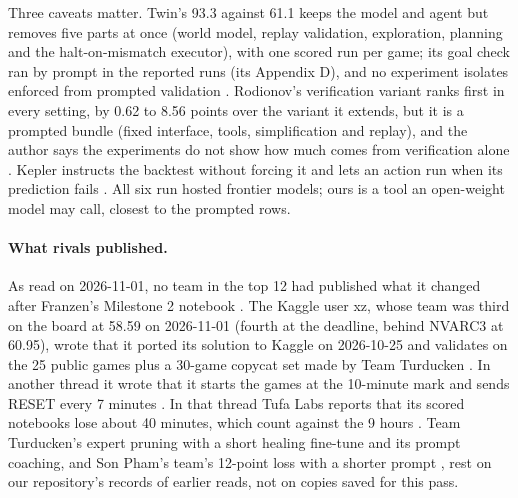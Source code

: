 Three caveats matter. %
Twin's 93.3 against 61.1 keeps the model and agent but removes five parts at once (world model, replay validation, exploration, planning and the halt-on-mismatch executor), with one scored run per game; its goal check ran by prompt in the reported runs (its Appendix D), and no experiment isolates enforced from prompted validation \citep{skoutnev2026twin}. %
Rodionov's verification variant ranks first in every setting, by 0.62 to 8.56 points over the variant it extends, but it is a prompted bundle (fixed interface, tools, simplification and replay), and the author says the experiments do not show how much comes from verification alone \citep{rodionov2026ablation}. %
Kepler instructs the backtest without forcing it and lets an action run when its prediction fails \citep{wu2026kepler}. %
All six run hosted frontier models; ours is a tool an open-weight model may call, closest to the prompted rows. %

\paragraph{What rivals published.}
As read on 2026-11-01, no team in the top 12 had published what it changed after Franzen's Milestone 2 notebook \citep{franzen2026milestone2}. %
The Kaggle user xz, whose team was third on the board at 58.59 on 2026-11-01 (fourth at the deadline, behind NVARC3 at 60.95), wrote that it ported its solution to Kaggle on 2026-10-25 and validates on the 25 public games plus a 30-game copycat set made by Team Turducken \citep{xz2026forum752485}. In another thread it wrote that it starts the games at the 10-minute mark and sends RESET every 7 minutes \citep{cottaar2026forum753843}. %
In that thread Tufa Labs reports that its scored notebooks lose about 40 minutes, which count against the 9 hours \citep{cottaar2026forum753843}. %
Team Turducken's expert pruning with a short healing fine-tune and its prompt coaching, and Son Pham's team's 12-point loss with a shorter prompt \citep{barney2026promptcommit}, rest on our repository's records of earlier reads, not on copies saved for this pass. %

